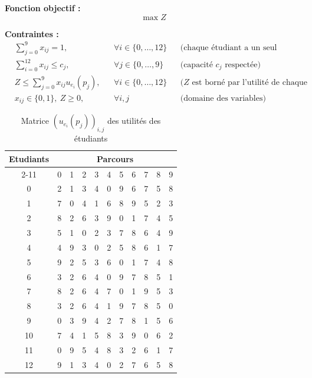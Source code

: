 \documentclass{article}
\begin{document}
\vspace{0.3cm}
\noindent\textbf{Fonction objectif :} 
\[ \max Z \]

\noindent\textbf{Contraintes :}
\begin{align*}
& \sum_{j=0}^{9} x_{ij} = 1, && \forall i \in \{0,\dots,12\} && \text{(chaque étudiant a un seul parcours)} \\
& \sum_{i=0}^{12} x_{ij} \leq c_j, && \forall j \in \{0,\dots,9\} && \text{(capacité $c_j$ respectée)} \\
& Z \leq \sum_{j=0}^{9} x_{ij} u_{e_i}(p_j), && \forall i \in \{0,\dots,12\} && \text{($Z$ est borné par l'utilité de chaque étudiant)} \\
& x_{ij} \in \{0, 1\}, \ Z \geq 0, && \forall i, j && \text{(domaine des variables)}
\end{align*}


\begin{table}[htbp]
  \centering
  \caption{Matrice $(u_{e_i}(p_j))_{i,j}$ des utilités des étudiants}
  \vspace{8pt}
  \label{tab:matrice_utilites_etu}
  
  \begin{tabular}{c | cccccccccc}
    \toprule
    \multirow{2}{*}{Etudiants} & \multicolumn{10}{c}{Parcours} \\
    \cmidrule(lr){2-11}
       & 0 & 1 & 2 & 3 & 4 & 5 & 6 & 7 & 8 & 9 \\
    \midrule
    0  & 2 & 1 & 3 & 4 & 0 & 9 & 6 & 7 & 5 & 8 \\
    1  & 7 & 0 & 4 & 1 & 6 & 8 & 9 & 5 & 2 & 3 \\
    2  & 8 & 2 & 6 & 3 & 9 & 0 & 1 & 7 & 4 & 5 \\
    3  & 5 & 1 & 0 & 2 & 3 & 7 & 8 & 6 & 4 & 9 \\
    4  & 4 & 9 & 3 & 0 & 2 & 5 & 8 & 6 & 1 & 7 \\
    5  & 9 & 2 & 5 & 3 & 6 & 0 & 1 & 7 & 4 & 8 \\
    6  & 3 & 2 & 6 & 4 & 0 & 9 & 7 & 8 & 5 & 1 \\
    7  & 8 & 2 & 6 & 4 & 7 & 0 & 1 & 9 & 5 & 3 \\
    8  & 3 & 2 & 6 & 4 & 1 & 9 & 7 & 8 & 5 & 0 \\
    9  & 0 & 3 & 9 & 4 & 2 & 7 & 8 & 1 & 5 & 6 \\
    10 & 7 & 4 & 1 & 5 & 8 & 3 & 9 & 0 & 6 & 2 \\
    11 & 0 & 9 & 5 & 4 & 8 & 3 & 2 & 6 & 1 & 7 \\
    12 & 9 & 1 & 3 & 4 & 0 & 2 & 7 & 6 & 5 & 8 \\
    \bottomrule
  \end{tabular}
\end{table}
\end{document}
